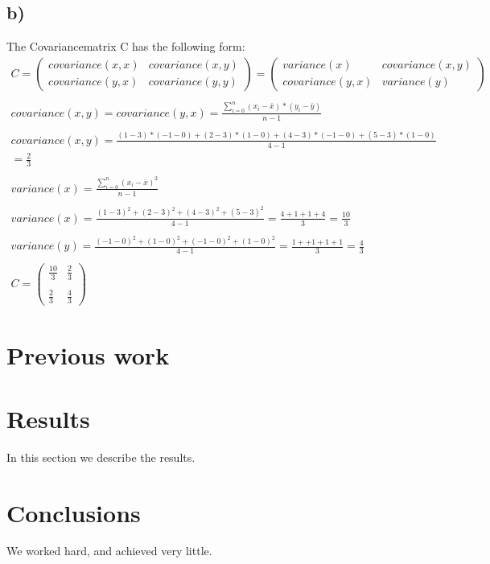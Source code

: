 \documentclass[12pt]{article}
\begin{document}
\subsection{b)}
The Covariancematrix C has the following form:
\begin{gather*}
    C = 
    \begin{pmatrix}
        covariance(x,x) & covariance(x,y) \\
        covariance(y,x) & covariance(y,y)
    \end{pmatrix}
    =
    \begin{pmatrix}
        variance(x) & covariance(x,y) \\
        covariance(y,x) & variance(y)
    \end{pmatrix}
    \\ \\
    covariance(x,y) = covariance(y,x) =  \frac{\displaystyle\sum_{i=0}^{n} (x_i - \bar{x}) * (y_i - \bar{y}) }{n-1}
    \\ \\
    covariance(x,y) = \frac{(1-3)*(-1-0) + (2-3)*(1-0) + (4-3)*(-1-0)+(5-3)*(1-0)}{4-1} \\ 
    = \frac{2}{3}
    \\ \\
    variance(x) = \frac{\displaystyle\sum_{i=0}^{n} (x_i -\bar{x})^2}{n-1}
    \\ \\
    variance(x) = \frac{(1-3)^2 + (2-3)^2 +(4-3)^2 +(5-3)^2}{4-1} = \frac{ 4 + 1 + 1 + 4}{3}= \frac{10}{3}
    \\ \\
    variance(y) = \frac{(-1 -0)^2 + (1-0)^2 +(-1 -0)^2 + (1-0)^2}{4-1} = \frac{ 1+ +1 +1 +1}{3} = \frac{4}{3}
    \\ \\
   C =  \begin{pmatrix}
       \frac{10}{3} & \frac{2}{3} \\ \\
        \frac{2}{3} & \frac{4}{3}
    \end{pmatrix}
\end{gather*}
\section{Previous work}\label{previous work}

\section{Results}\label{results}
In this section we describe the results.

\section{Conclusions}\label{conclusions}
We worked hard, and achieved very little.



\end{document}
